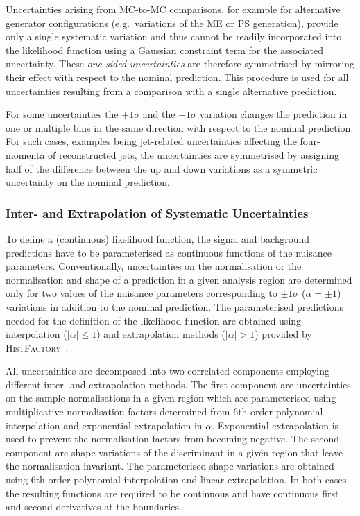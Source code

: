 Uncertainties arising from MC-to-MC comparisons, for example for
alternative generator configurations (e.g.\ variations of the ME or PS
generation), provide only a single systematic variation and thus
cannot be readily incorporated into the likelihood function using a
Gaussian constraint term for the associated uncertainty. These
\emph{one-sided uncertainties} are therefore symmetrised by mirroring
their effect with respect to the nominal prediction. This procedure is
used for all uncertainties resulting from a comparison with a single
alternative prediction.

For some uncertainties the $+1\sigma$ and the $-1\sigma$ variation
changes the prediction in one or multiple bins in the same direction
with respect to the nominal prediction. For such cases, examples being
jet-related uncertainties affecting the four-momenta of reconstructed
jets, the uncertainties are symmetrised by assigning half of the
difference between the up and down variations as a symmetric
uncertainty on the nominal prediction.


\subsubsection{Inter- and Extrapolation of Systematic Uncertainties}

To define a (continuous) likelihood function, the signal and
background predictions have to be parameterised as continuous functions
of the nuisance parameters. Conventionally, uncertainties on the
normalisation or the normalisation and shape of a prediction in a
given analysis region are determined only for two values of the
nuisance parameters corresponding to $\pm 1\sigma$ ($\alpha = \pm 1$)
variations in addition to the nominal prediction. The parameterised
predictions needed for the definition of the likelihood function are
obtained using interpolation ($\vert \alpha \vert \leq 1$) and
extrapolation methods ($\vert \alpha \vert > 1$) provided by
\textsc{HistFactory}~\cite{cranmer2012}.

All uncertainties are decomposed into two correlated components
employing different inter- and extrapolation methods. The first
component are uncertainties on the sample normalisations in a given
region which are parameterised using multiplicative normalisation
factors determined from 6th order polynomial interpolation and
exponential extrapolation in $\alpha$. Exponential extrapolation is
used to prevent the normalisation factors from becoming negative. The
second component are shape variations of the discriminant in a given
region that leave the normalisation invariant. The parameterised shape
variations are obtained using 6th order polynomial interpolation and
linear extrapolation. In both cases the resulting functions are
required to be continuous and have continuous first and second
derivatives at the boundaries.


